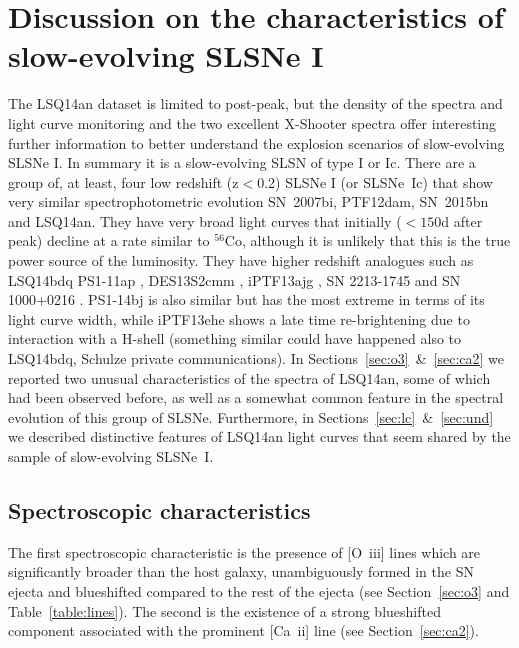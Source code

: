 \documentclass[useAMS,usenatbib]{mn2e}
\def\an{LSQ14an}
\def\oiii{[O~{\sc iii}]}
\begin{document}
\section{Discussion on the characteristics of slow-evolving SLSNe I}\label{sec:dis}

The \an\/ dataset is limited to post-peak, but the density of the spectra and light curve monitoring and the two excellent X-Shooter 
spectra offer interesting further information to better understand the explosion scenarios of slow-evolving SLSNe I.
In summary it is a slow-evolving SLSN of type I or Ic. There are a group of, at least, four low redshift (z$<$0.2) SLSNe I (or SLSNe~Ic) that show very 
similar spectrophotometric evolution SN~2007bi, PTF12dam, SN~2015bn and LSQ14an. They have very broad
light curves that initially ($<150$d after peak) decline at a rate similar to $^{56}${Co}, although it is unlikely that this is the true power source of the luminosity.  They have higher redshift analogues such as LSQ14bdq \citep[$z=0.3450$;][]{ni15a}
PS1-11ap \citep[$z=0.5240$;][]{mc14}, DES13S2cmm \citep[$z=0.6630$;][]{pap15}, iPTF13ajg \citep[$z=0.7403$;][]{vr14}, SN 2213-1745 and SN 1000+0216 \citep[$z=2.0458$ and $z=3.8993$, respectively;][]{2012Natur.491..228C}.  PS1-14bj \citep[$z=0.5215$;][]{lu14} is also similar but has the most extreme in terms of its light curve width, while iPTF13ehe \citep[$z=0.3434$;][]{yan15} shows a late time re-brightening due to interaction with a H-shell (something similar could have happened also to LSQ14bdq, Schulze private communications). 
In Sections~\ref{sec:o3}~\&~\ref{sec:ca2} we reported two unusual characteristics of the spectra of LSQ14an, some of which had been observed before, as well as a somewhat common feature in the spectral evolution of this group of SLSNe. Furthermore, in Sections~\ref{sec:lc}~\&~\ref{sec:und} we described distinctive features of \an\/ light curves that seem shared by the sample of slow-evolving SLSNe~I.

\subsection{Spectroscopic characteristics}

The first spectroscopic characteristic is the presence of \oiii\/ lines which are
significantly broader than the host galaxy, unambiguously formed in the SN ejecta and blueshifted compared to the rest of the ejecta (see Section~\ref{sec:o3} and Table~\ref{table:lines}). 
The second is the existence of a strong blueshifted component 
associated with the prominent [Ca~{\sc ii}] line (see Section~\ref{sec:ca2}). 
\end{document}
